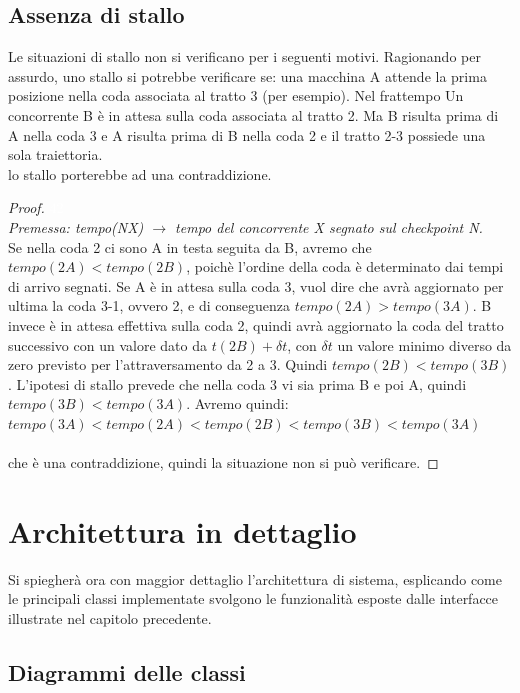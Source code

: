 \subsection{Assenza di stallo}
Le situazioni di stallo non si verificano per i seguenti motivi. Ragionando per assurdo, uno stallo si potrebbe verificare se:
una macchina A attende la prima posizione nella coda associata al tratto 3 (per esempio). 
Nel frattempo Un concorrente B \`{e} in attesa sulla coda associata al tratto 2. Ma B risulta prima di A nella coda 3 e A 
risulta prima di B nella coda 2 e il tratto 2-3 possiede una sola traiettoria.\\
lo stallo porterebbe ad una contraddizione.\\
\begin{proof}
\textcolor{white}{42}\\
\emph{Premessa: tempo(NX) $\rightarrow$ tempo del concorrente X segnato sul checkpoint N.}\\
	Se nella coda 2 ci sono A in testa seguita da B, avremo che $tempo(2A)<tempo(2B)$, poich\`{e} l'ordine della coda \`{e} 
	determinato dai tempi di arrivo segnati.
	Se A \`{e} in attesa sulla coda 3, vuol dire che avr\`{a} aggiornato per ultima la coda 3-1, ovvero 2, e di conseguenza $tempo(2A)>tempo(3A)$.
	B invece \`{e} in attesa effettiva sulla coda 2, quindi avr\`{a} aggiornato la coda del tratto successivo con un valore dato da $t(2B)+ \delta t$, 
	con $ \delta t$ un valore minimo diverso da zero previsto per l'attraversamento da 2 a 3. Quindi $tempo(2B)<tempo(3B)$.
	L'ipotesi di stallo prevede che nella coda 3 vi sia prima B e poi A, quindi $tempo(3B)<tempo(3A)$.
	Avremo quindi:\\

	$tempo(3A)<tempo(2A)<tempo(2B)<tempo(3B)<tempo(3A)$\\\\
	che \`{e} una contraddizione, quindi la situazione non si pu\`{o} verificare.
\end{proof}
\newpage
\section{Architettura in dettaglio}
Si spiegher\`{a} ora con maggior dettaglio l'architettura di sistema, esplicando come le principali classi implementate svolgono le funzionalit\`{a}
esposte dalle interfacce illustrate nel capitolo precedente.
\subsection{Diagrammi delle classi}

